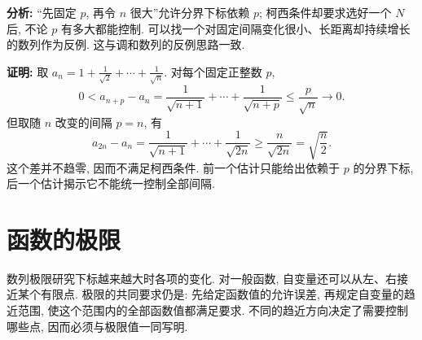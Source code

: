 \documentclass[UTF8,openany]{ctexbook}
\theoremstyle{chinesetextbook}
\newenvironment{cnproof}{\par\indent\textbf{证明:} \ignorespaces}{\par}
\begin{document}
\par\indent\textbf{分析:} “先固定 $p$, 再令 $n$ 很大”允许分界下标依赖 $p$; 柯西条件却要求选好一个 $N$ 后, 不论 $p$ 有多大都能控制. 可以找一个对固定间隔变化很小、长距离却持续增长的数列作为反例. 这与调和数列的反例思路一致.
\begin{cnproof}
取 $\displaystyle a_n=1+\frac1{\sqrt2}+\cdots+\frac1{\sqrt n}$. 对每个固定正整数 $p$,
\[
0<a_{n+p}-a_n=\frac1{\sqrt{n+1}}+\cdots+\frac1{\sqrt{n+p}}\le\frac p{\sqrt n}\to0.
\]
但取随 $n$ 改变的间隔 $p=n$, 有
\[
a_{2n}-a_n=\frac1{\sqrt{n+1}}+\cdots+\frac1{\sqrt{2n}}
\ge\frac n{\sqrt{2n}}=\sqrt{\frac n2}.
\]
这个差并不趋零, 因而不满足柯西条件. 前一个估计只能给出依赖于 $p$ 的分界下标, 后一个估计揭示它不能统一控制全部间隔.
\end{cnproof}

\section{函数的极限}
数列极限研究下标越来越大时各项的变化. 对一般函数, 自变量还可以从左、右接近某个有限点. 极限的共同要求仍是: 先给定函数值的允许误差, 再规定自变量的趋近范围, 使这个范围内的全部函数值都满足要求. 不同的趋近方向决定了需要控制哪些点, 因而必须与极限值一同写明.
\end{document}
